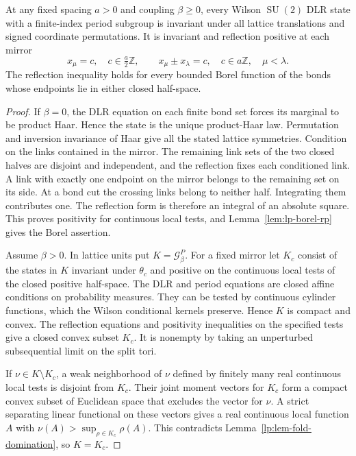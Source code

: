 \documentclass[11pt,letterpaper,reqno]{amsart}
\makeatletter
\numberwithin{equation}{section}
\theoremstyle{definition}
\newcommand{\ms@majorstart}{%
  \pushQED{\qed}\renewcommand{\qedsymbol}{$\blacksquare\square$}}
\newenvironment{theorem}[1][]{\ms@majorstart\ms@theorem[#1]}
  {\popQED\endms@theorem}
\theoremstyle{remark}
\makeatother
\begin{document}
\begin{samepage}
\begin{theorem}[All admissible mirrors]\label{lp:thm-all-mirrors}
At any fixed spacing \(a>0\) and coupling \(\beta\ge0\), every
Wilson \(\operatorname{SU}(2)\) DLR state with a finite-index
period subgroup is invariant under all lattice translations and
signed coordinate permutations. It is invariant and reflection
positive at each mirror
\[
 x_\mu=c,\quad c\in\tfrac a2\mathbb Z,\qquad
 x_\mu\pm x_\lambda=c,\quad c\in a\mathbb Z,\quad\mu<\lambda .
\]
The reflection inequality holds for every bounded Borel function
of the bonds whose endpoints lie in either closed half-space.
\end{theorem}
\end{samepage}

\begin{proof}
If \(\beta=0\), the DLR equation on each finite bond set forces
its marginal to be product Haar. Hence the state is the unique
product-Haar law. Permutation and inversion invariance of Haar
give all the stated lattice symmetries. Condition on the links
contained in the mirror. The remaining link sets of the two closed
halves are disjoint and independent, and the reflection fixes each
conditioned link. A link with exactly one endpoint on the mirror
belongs to the remaining set on its side. At a bond cut the crossing
links belong to neither half. Integrating them contributes one. The reflection form is therefore
an integral of an absolute square. This proves positivity for
continuous local tests, and Lemma~\ref{lem:lp-borel-rp} gives the
Borel assertion.

Assume \(\beta>0\). In lattice units put
\(K=\mathcal G_\beta^P\). For a fixed
mirror let \(K_c\) consist of the states in \(K\) invariant
under \(\theta_c\) and positive on the continuous local tests
of the closed positive half-space. The DLR and period equations
are closed affine conditions on probability measures. They can
be tested by continuous cylinder functions, which the Wilson
conditional kernels preserve. Hence \(K\) is compact and convex.
The reflection equations and positivity
inequalities on the specified tests give a closed convex
subset \(K_c\). It is nonempty by taking an unperturbed
subsequential limit on the split tori.

If \(\nu\in K\setminus K_c\), a weak neighborhood of \(\nu\)
defined by finitely many real continuous local tests is
disjoint from \(K_c\). Their joint moment vectors for
\(K_c\) form a compact convex subset of Euclidean space that
excludes the vector for \(\nu\). A strict separating linear
functional on these vectors gives a real continuous local
function \(A\) with \(\nu(A)>\sup_{\rho\in K_c}\rho(A)\).
This contradicts Lemma~\ref{lp:lem-fold-domination}, so \(K=K_c\).


\end{proof}
\end{document}
